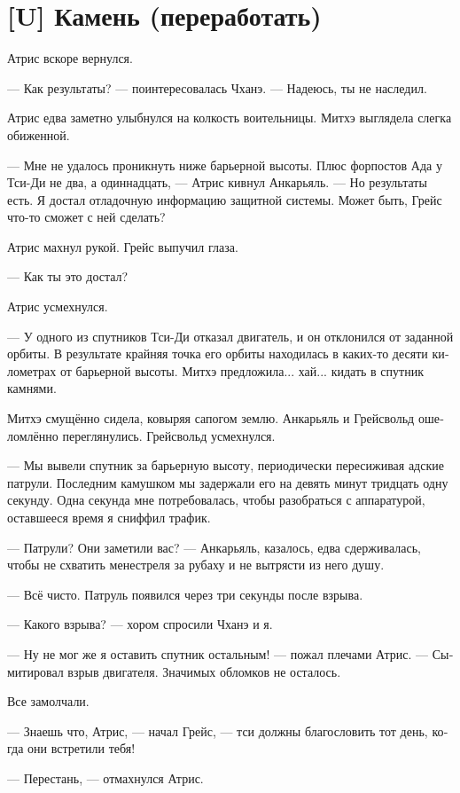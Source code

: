 \documentclass[a4paper,12pt,fleqn]{book}\usepackage{polyglossia}\setdefaultlanguage[babelshorthands=true]{russian}\setotherlanguage{english}\defaultfontfeatures{Ligatures=TeX,Mapping=tex-text}\usepackage{xcolor}\newcommand{\ml}[3]{#2}
\begin{document}
\section{[U] Камень (переработать)}

Атрис вскоре вернулся.

--- Как результаты? --- поинтересовалась Чханэ.
--- Надеюсь, ты не наследил.

Атрис едва заметно улыбнулся на колкость воительницы.
Митхэ выглядела слегка обиженной.

--- Мне не удалось проникнуть ниже барьерной высоты.
Плюс форпостов Ада у Тси-Ди не два, а одиннадцать, --- Атрис кивнул Анкарьяль.
--- Но результаты есть.
Я достал отладочную информацию защитной системы.
Может быть, Грейс что-то сможет с ней сделать?

Атрис махнул рукой.
Грейс выпучил глаза.

--- Как ты это достал?

Атрис усмехнулся.

--- У одного из спутников Тси-Ди отказал двигатель, и он отклонился от заданной орбиты.
В результате крайняя точка его орбиты находилась в каких-то десяти километрах от барьерной высоты.
Митхэ предложила... хай... кидать в спутник камнями.

Митхэ смущённо сидела, ковыряя сапогом землю.
Анкарьяль и Грейсвольд ошеломлённо переглянулись.
Грейсвольд усмехнулся.

--- Мы вывели спутник за барьерную высоту, периодически пересиживая адские патрули.
Последним камушком мы задержали его на девять минут тридцать одну секунду.
Одна секунда мне потребовалась, чтобы разобраться с аппаратурой, оставшееся время я сниффил трафик.

--- Патрули?
Они заметили вас? --- Анкарьяль, казалось, едва сдерживалась, чтобы не схватить менестреля за рубаху и не вытрясти из него душу.

--- Всё чисто.
Патруль появился через три секунды после взрыва.

--- Какого взрыва? --- хором спросили Чханэ и я.

--- Ну не мог же я оставить спутник остальным! --- пожал плечами Атрис.
--- Сымитировал взрыв двигателя.
Значимых обломков не осталось.

Все замолчали.

--- Знаешь что, Атрис, --- начал Грейс, --- тси должны благословить тот день, когда они встретили тебя!

--- Перестань, --- отмахнулся Атрис.
\end{document}
